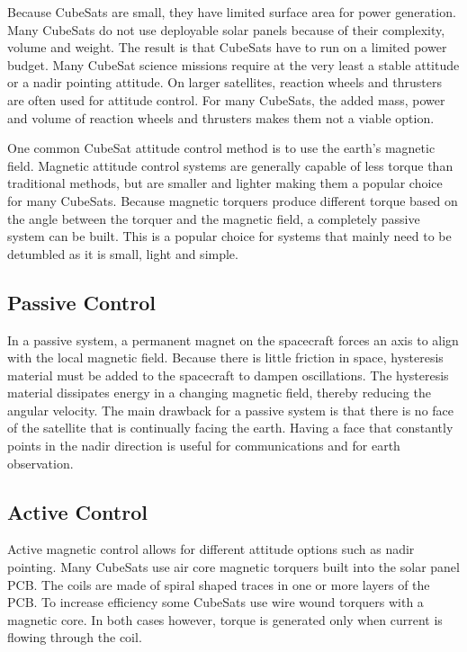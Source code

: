 Because CubeSats are small, they have limited surface area for power generation. Many CubeSats do not use deployable solar panels because of their complexity, volume and weight. The result is that CubeSats have to run on a limited power budget. Many CubeSat science missions require at the very least a stable attitude or a nadir pointing attitude. On larger satellites, reaction wheels and thrusters are often used for attitude control. For many CubeSats, the added mass, power and volume of reaction wheels and thrusters makes them not a  viable option.

One common CubeSat attitude control method is to use the earth's magnetic field. Magnetic attitude control systems are generally capable of less torque than traditional methods, but are smaller and lighter making them a popular choice for many CubeSats. Because magnetic torquers produce different torque based on the angle between the torquer and the magnetic field, a completely passive system can be built. This is a popular choice for systems that mainly need to be detumbled as it is small, light and simple. 

\subsection{Passive Control}

In a passive system, a permanent magnet on the spacecraft forces an axis to align with the local magnetic field. Because there is little friction in space, hysteresis material must be added to the spacecraft to dampen oscillations. The hysteresis material dissipates energy in a changing magnetic field, thereby reducing the angular velocity. The main drawback for a passive system is that there is no face of the satellite that is continually facing the earth. Having a face that constantly points in the nadir direction is useful for communications and for earth observation.

\subsection{Active Control}

Active magnetic control allows for different attitude options such as nadir pointing. Many CubeSats use air core magnetic torquers built into the solar panel \ac{PCB}. The coils are made of spiral shaped traces in one or more layers of the \ac{PCB}. To increase efficiency some CubeSats use wire wound torquers with a magnetic core. In both cases however, torque is generated only when current is flowing through the coil. 

